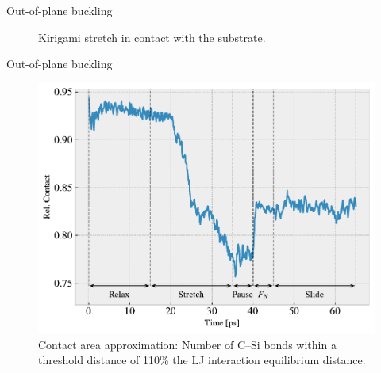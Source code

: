 \documentclass[
	10pt, %
]{beamer}
\begin{document}
%
%
\begin{frame}{Out-of-plane buckling}
	\begin{figure}
		\centering    
		\caption{Kirigami stretch in contact with the substrate.}
	\end{figure} 
\end{frame}
%
%
\begin{frame}{Out-of-plane buckling}
	\begin{figure}
		\includegraphics[height=0.7\textheight]{figures/contact_pct.pdf}
		\caption{Contact area approximation: Number of C--Si bonds within a threshold distance of 110\% the LJ interaction equilibrium distance.}
	\end{figure}	
\end{frame}
\end{document}
